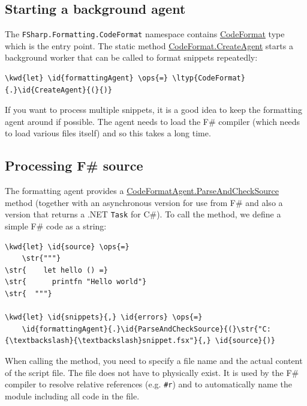 \documentclass{article}
\newcommand{\id}[1]{\textcolor{black}{#1}}
\newcommand{\kwd}[1]{\textcolor{navy}{#1}}
\newcommand{\ops}[1]{\textcolor{purple}{#1}}
\newcommand{\str}[1]{\textcolor{olive}{#1}}
\begin{document}
\subsection*{Starting a background agent}



The \texttt{FSharp.Formatting.CodeFormat} namespace contains \href{https://fsprojects.github.io/FSharp.Formatting/reference/fsharp-formatting-codeformat-codeformat.html}{CodeFormat} type which is the
entry point. The static method \href{https://fsprojects.github.io/FSharp.Formatting/reference/fsharp-formatting-codeformat-codeformat.html\#CreateAgent}{CodeFormat.CreateAgent} starts a background worker that
can be called to format snippets repeatedly:
\begin{Verbatim}[commandchars=\\\{\}]
\kwd{let} \id{formattingAgent} \ops{=} \ltyp{CodeFormat}{.}\id{CreateAgent}{(}{)}
\end{Verbatim}



If you want to process multiple snippets, it is a good idea to keep the
formatting agent around if possible. The agent needs to load the F\# compiler
(which needs to load various files itself) and so this takes a long time.
\subsection*{Processing F\# source}



The formatting agent provides a \href{https://fsprojects.github.io/FSharp.Formatting/reference/fsharp-formatting-codeformat-codeformatagent.html}{CodeFormatAgent.ParseAndCheckSource} method (together with an asynchronous
version for use from F\# and also a version that returns a .NET \texttt{Task} for C\#).
To call the method, we define a simple F\# code as a string:
\begin{Verbatim}[commandchars=\\\{\}]
\kwd{let} \id{source} \ops{=}
    \str{"""}
\str{    let hello () =}
\str{      printfn "Hello world"}
\str{  """}

\kwd{let} \id{snippets}{,} \id{errors} \ops{=}
    \id{formattingAgent}{.}\id{ParseAndCheckSource}{(}\str{"C:{\textbackslash}{\textbackslash}snippet.fsx"}{,} \id{source}{)}
\end{Verbatim}



When calling the method, you need to specify a file name and the actual content
of the script file. The file does not have to physically exist. It is used by the
F\# compiler to resolve relative references (e.g. \texttt{\#r}) and to automatically name
the module including all code in the file.
\end{document}
